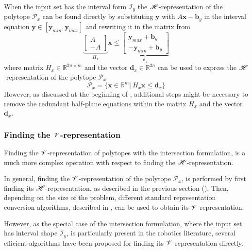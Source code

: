 When the input set has the interval form $\mathcal{I}_y$ the $\mathscr{H}$-representation of the polytope $\mathcal{P}_x$ can be found directly by substituting $\bm{y}$ with $A\bm{x}-\bm{b}_y$ in the interval equation $\bm{y}\in[\bm{y}_{min},\bm{y}_{max}]$ and rewriting it in the matrix from
\begin{equation}
   \underbrace{\begin{bmatrix}
        A\\
        -A
    \end{bmatrix}}_{H_x}\bm{x} \leq \underbrace{\begin{bmatrix}
         \bm{y}_{max} + \bm{b}_y\\
        -\bm{y}_{min} + \bm{b}_y 
    \end{bmatrix} }_{\bm{d}_x}
\end{equation}
where matrix $H_x\in\mathbb{R}^{2n \times m}$ and the vector $\bm{d}_x\in\mathbb{R}^{2n}$ can be used to express the $\mathscr{H}$-representation of the polytope $\mathcal{P}_x$
\begin{equation}
    \mathcal{P}_x=\{\bm{x}\in\mathbb{R}^m |~ H_x\bm{x} \leq \bm{d}_x \}
    \label{eq:inter_h_rep}
\end{equation}
However, as discussed at the beginning of , additional steps might be necessary to remove the redundant half-plane equations within the matrix $H_x$ and the vector $\bm{d}_x$.


\subsubsection{Finding the $\mathscr{V}$-representation} 
\label{ch:inter_v_rep}
Finding the $\mathscr{V}$-representation of polytopes with the intersection formulation, is a much more complex operation with respect to finding the $\mathscr{H}$-representation. 

In general, finding the $\mathscr{V}$-representation of the polytope $\mathcal{P}_x$, is performed by first finding its $\mathscr{H}$-representation, as described in the previous section (). Then, depending on the size of the problem, different standard representation conversion algorithms, described in , can be used to obtain its $\mathscr{V}$-representation.

However, as the special case of the intersection formulation, where the input set has interval shape $\mathcal{I}_y$, is particularly present in the robotics literature, several efficient algorithms have been proposed for finding its $\mathscr{V}$-representation directly.



